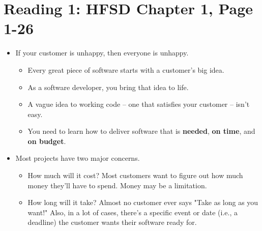 \documentclass[letterpaper]{article}
\begin{document}
\section{Reading 1: HFSD Chapter 1, Page 1-26}
\begin{itemize}
    \item If your customer is unhappy, then everyone is unhappy. 
    \begin{itemize}
        \item Every great piece of software starts with a customer's big idea. 
        \item As a software developer, you bring that idea to life.
        \item A vague idea to working code -- one that satisfies your customer -- isn't easy. 
        \item You need to learn how to deliver software that is \textbf{needed}, \textbf{on time}, and \textbf{on budget}.
    \end{itemize}

    \item Most projects have two major concerns. 
    \begin{itemize}
        \item How much will it cost? Most customers want to figure out how much money they'll have to spend. Money may be a limitation. 
        \item How long will it take? Almost no customer ever says "Take as long as you want!" Also, in a lot of cases, there's a specific event or date (i.e., a deadline) the customer wants their software ready for.  
    \end{itemize}


\end{itemize}
\end{document}
